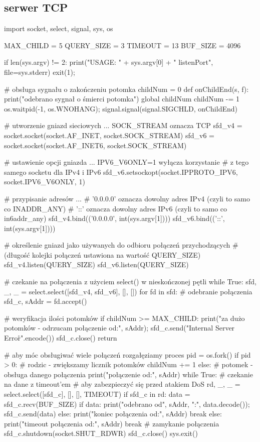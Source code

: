 \subsection{serwer TCP}
\begin{CodeFrame*}[python]{}
import socket, select, signal, sys, os

MAX_CHILD = 5
QUERY_SIZE = 3
TIMEOUT = 13
BUF_SIZE = 4096

if len(sys.argv) != 2:
	print("USAGE: " + sys.argv[0] + " listenPort", file=sys.stderr)
	exit(1);

# obsługa sygnału o zakończeniu potomka
childNum = 0
def onChildEnd(s, f):
	print("odebrano sygnał o śmierci potomka")
	global childNum
	childNum -= 1
	os.waitpid(-1, os.WNOHANG);
signal.signal(signal.SIGCHLD, onChildEnd)

# utworzenie gniazd sieciowych ... SOCK_STREAM oznacza TCP
sfd_v4 = socket.socket(socket.AF_INET,  socket.SOCK_STREAM)
sfd_v6 = socket.socket(socket.AF_INET6, socket.SOCK_STREAM)

# ustawienie opcji gniazda ... IPV6_V6ONLY=1 wyłącza korzystanie
# z tego samego socketu dla IPv4 i IPv6
sfd_v6.setsockopt(socket.IPPROTO_IPV6, socket.IPV6_V6ONLY, 1)

# przypisanie adresów ...
# '0.0.0.0' oznacza dowolny adres IPv4 (czyli to samo co INADDR_ANY)
# '::' oznacza dowolny adres IPv6 (czyli to samo co in6addr_any)
sfd_v4.bind(('0.0.0.0', int(sys.argv[1])))
sfd_v6.bind(('::',      int(sys.argv[1])))

# określenie gniazd jako używanych do odbioru połączeń przychodzących
# (długość kolejki połączeń ustawiona na wartość QUERY_SIZE)
sfd_v4.listen(QUERY_SIZE)
sfd_v6.listen(QUERY_SIZE)

# czekanie na połączenia z użyciem select() w nieskończonej pętli
while True:
	sfd, _, _ = select.select([sfd_v4, sfd_v6], [], [])
	for fd in sfd:
		#  odebranie połączenia
		sfd_c, sAddr = fd.accept()
		
		# weryfikacja ilości potomków
		if childNum >= MAX_CHILD:
			print("za dużo potomków - odrzucam połączenie od:", sAddr);
			sfd_c.send("Internal Server Error\r\n".encode())
			sfd_c.close()
			return
		
		# aby móc obsługiwać wiele połączeń rozgałęziamy proces
		pid = os.fork()
		if pid > 0:
			# rodzic - zwiększamy licznik potomków
			childNum += 1
		else:
			# potomek - obsługa danego połączenia
			print("połączenie od:", sAddr)
			while True:
				# czekanie na dane z timeout'em
				# aby zabezpieczyć się przed atakiem DoS
				rd, _, _ = select.select([sfd_c], [], [], TIMEOUT)
				if sfd_c in rd:
					data = sfd_c.recv(BUF_SIZE)
					if data:
						print("odebrano od", sAddr, ":", data.decode());
						sfd_c.send(data)
					else:
						print("koniec połączenia od:", sAddr)
						break
				else:
					print("timeout połączenia od:", sAddr)
					break
			# zamykanie połączenia
			sfd_c.shutdown(socket.SHUT_RDWR)
			sfd_c.close()
			sys.exit()
\end{CodeFrame*}
